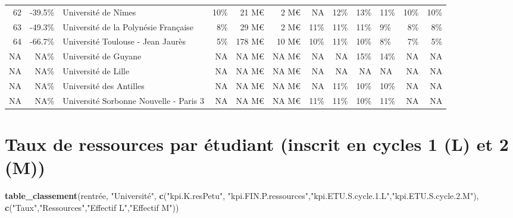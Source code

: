 \documentclass[12pt,french,landscape]{article}
\newenvironment{Shaded}{\begin{snugshade}}{\end{snugshade}}
\newcommand{\KeywordTok}[1]{\textcolor[rgb]{0.13,0.29,0.53}{\textbf{#1}}}
\newcommand{\NormalTok}[1]{#1}
\newcommand{\StringTok}[1]{\textcolor[rgb]{0.31,0.60,0.02}{#1}}
\begin{document}
\begin{longtable}{rrlrrrrrrlrr}
62 & -39.5\% & Université de Nîmes & 10\% & 21 M€ & 2 M€ & NA & 12\% & 13\% & 11\% & 10\% & 10\%\\
\rowcolor{gray!6}  63 & -49.3\% & Université de la Polynésie Française & 8\% & 29 M€ & 2 M€ & 11\% & 11\% & 11\% & 9\% & 8\% & 8\%\\
64 & -66.7\% & Université Toulouse - Jean Jaurès & 5\% & 178 M€ & 10 M€ & 10\% & 11\% & 10\% & 8\% & 7\% & 5\%\\
\rowcolor{gray!6}  NA & NA\% & Université de Guyane & NA & NA M€ & NA M€ & NA & NA & 15\% & 14\% & NA & NA\\
\addlinespace
NA & NA\% & Université de Lille & NA & NA M€ & NA M€ & NA & NA & NA & NA & NA & NA\\
\rowcolor{gray!6}  NA & NA\% & Université des Antilles & NA & NA M€ & NA M€ & NA & 11\% & 10\% & 10\% & NA & NA\\
NA & NA\% & Université Sorbonne Nouvelle - Paris 3 & NA & NA M€ & NA M€ & 11\% & 11\% & 10\% & 11\% & NA & NA\\*
\end{longtable}

\newpage

\hypertarget{taux-de-ressources-par-uxe9tudiant-inscrit-en-cycles-1-l-et-2-m}{%
\section{Taux de ressources par étudiant (inscrit en cycles 1 (L) et 2
(M))}\label{taux-de-ressources-par-uxe9tudiant-inscrit-en-cycles-1-l-et-2-m}}

\begin{Shaded}
\begin{Highlighting}[]
\KeywordTok{table_classement}\NormalTok{(rentrée, }\StringTok{"Université"}\NormalTok{,}
                  \KeywordTok{c}\NormalTok{(}\StringTok{"kpi.K.resPetu"}\NormalTok{, }\StringTok{"kpi.FIN.P.ressources"}\NormalTok{,}\StringTok{"kpi.ETU.S.cycle.1.L"}\NormalTok{,}\StringTok{"kpi.ETU.S.cycle.2.M"}\NormalTok{),}
                  \KeywordTok{c}\NormalTok{(}\StringTok{"Taux"}\NormalTok{,}\StringTok{"Ressources"}\NormalTok{,}\StringTok{"Effectif L"}\NormalTok{,}\StringTok{"Effectif M"}\NormalTok{))}
\end{Highlighting}
\end{Shaded}
\end{document}

